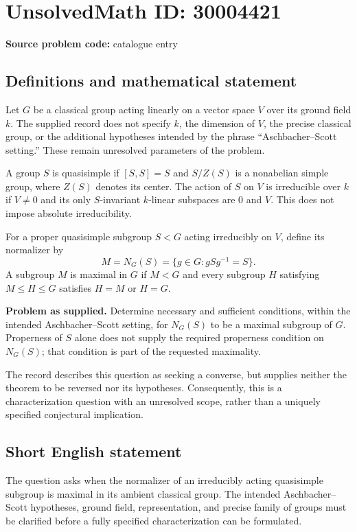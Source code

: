 \documentclass[11pt]{article}
\begin{document}
\section*{UnsolvedMath ID: 30004421}
\textbf{Source problem code:} catalogue entry
\subsection{Definitions and mathematical statement}
Let \(G\) be a classical group acting linearly on a vector space \(V\) over its ground field \(k\). The supplied record does not specify \(k\), the dimension of \(V\), the precise classical group, or the additional hypotheses intended by the phrase ``Aschbacher--Scott setting.'' These remain unresolved parameters of the problem.

A group \(S\) is quasisimple if \([S,S]=S\) and \(S/Z(S)\) is a nonabelian simple group, where \(Z(S)\) denotes its center. The action of \(S\) on \(V\) is irreducible over \(k\) if \(V\ne 0\) and its only \(S\)-invariant \(k\)-linear subspaces are \(0\) and \(V\). This does not impose absolute irreducibility.

For a proper quasisimple subgroup \(S<G\) acting irreducibly on \(V\), define its normalizer by
\[
M=N_G(S)=\{g\in G:gSg^{-1}=S\}.
\]
A subgroup \(M\) is maximal in \(G\) if \(M<G\) and every subgroup \(H\) satisfying \(M\le H\le G\) satisfies \(H=M\) or \(H=G\).

\textbf{Problem as supplied.} Determine necessary and sufficient conditions, within the intended Aschbacher--Scott setting, for \(N_G(S)\) to be a maximal subgroup of \(G\). Properness of \(S\) alone does not supply the required properness condition on \(N_G(S)\); that condition is part of the requested maximality.

The record describes this question as seeking a converse, but supplies neither the theorem to be reversed nor its hypotheses. Consequently, this is a characterization question with an unresolved scope, rather than a uniquely specified conjectural implication.
\subsection{Short English statement}
The question asks when the normalizer of an irreducibly acting quasisimple subgroup is maximal in its ambient classical group. The intended Aschbacher--Scott hypotheses, ground field, representation, and precise family of groups must be clarified before a fully specified characterization can be formulated.
\end{document}
